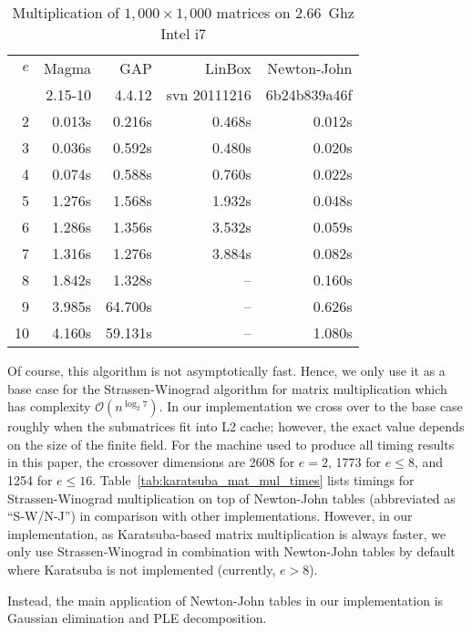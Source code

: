 \documentclass{sig-alternate}
\newcommand{\ord}[1]{\ensuremath{\mathcal{O}\!\left(#1\right)}}
\newcommand{\mycomputer}{2.66~Ghz Intel i7\xspace}
\begin{document}
\begin{table}[ht]
\begin{small}
\begin{center}
\begin{tabular}{|r|r|r|r|r|}
\hline
 $e$ & Magma & GAP & LinBox & Newton-John \\
     & {\footnotesize 2.15-10} & {\footnotesize 4.4.12} & {\footnotesize svn 20111216} & {\footnotesize 6b24b839a46f}\\
\hline
 2 & 0.013s &  0.216s & 0.468s & 0.012s\\
 3 & 0.036s &  0.592s & 0.480s & 0.020s\\
 4 & 0.074s &  0.588s & 0.760s & 0.022s\\
 5 & 1.276s &  1.568s & 1.932s & 0.048s\\
 6 & 1.286s &  1.356s & 3.532s & 0.059s\\
 7 & 1.316s &  1.276s & 3.884s & 0.082s\\
 8 & 1.842s &  1.328s & --     & 0.160s\\
 9 & 3.985s & 64.700s & --     & 0.626s\\
10 & 4.160s & 59.131s & --     & 1.080s\\
\hline
\end{tabular}
\end{center}
\end{small}
\caption{Multiplication of $1,000 \times 1,000$ matrices on \mycomputer}
\label{tab:travolta_mat_mul_times}
\end{table}

Of course, this algorithm is not asymptotically fast. Hence, we only use it as a base case for the Strassen-Winograd algorithm \cite{Strassen} for matrix multiplication which has complexity $\ord{n^{\log_2 7}}$. In our implementation we cross over to the base case roughly when the submatrices fit into L2 cache; however, the exact value depends on the size of the finite field. For the machine used to produce all timing results in this paper, the crossover dimensions are 2608 for $e=2$, 1773 for $e\leq 8$, and 1254 for $e \leq 16$. Table~\ref{tab:karatsuba_mat_mul_times} lists timings for Strassen-Winograd multiplication on top of Newton-John tables (abbreviated as ``S-W/N-J'') in comparison with other implementations. However, in our implementation, as Karatsuba-based matrix multiplication is always faster, we only use Strassen-Winograd in combination with Newton-John tables by default where Karatsuba is not implemented (currently, $e>8$).

Instead, the main application of Newton-John tables in our implementation is Gaussian elimination and PLE decomposition.
\end{document}
